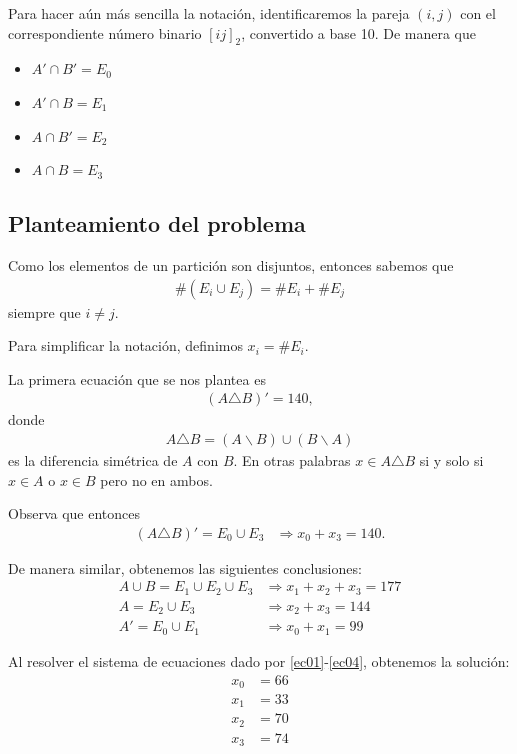 Para hacer aún más sencilla la notación, identificaremos la pareja $ (i,j) $ con el correspondiente número binario $ [ij]_{2} $, convertido a base 10. De manera que 
\begin{itemize}
	\item $ A' \cap B' = E_{0}$
	\item $ A'  \cap B = E_{1}$
	\item $ A \cap B'  = E_{2}$
	\item $ A  \cap B  = E_{3}$
\end{itemize}

\subsection{Planteamiento del problema}

Como los elementos de un partición son disjuntos, entonces sabemos que 
\begin{align}
	\#\left(E_i\cup E_j\right) = \#E_i+\#E_j
\end{align}
siempre que $ i\neq j $.

Para simplificar la notación, definimos $ x_i=\# E_i. $

La primera ecuación que se nos plantea es
\begin{align}
	\left(A \triangle B \right)'=140,
\end{align}
donde 
\begin{align}
	A\triangle B = (A\backslash B)\cup(B\backslash A)
\end{align}
es la diferencia simétrica de $ A $ con $ B $. En otras palabras $ x\in A \triangle B $ si y solo si $ x\in A $ o $ x \in B $ pero no en ambos.

Observa que entonces
\begin{align}
	\label{ec01}
	\left(A\triangle B\right)' = E_0 \cup E_3 &
	\Rightarrow
	x_0 + x_3 = 140.
\end{align}

De manera similar, obtenemos las siguientes conclusiones:
\begin{align}
	\label{ec02}
	A\cup B = E_1\cup E_2 \cup E_3 &
	\Rightarrow x_1+x_2+x_3=177 \\
	\label{ec03}
	A = E_2 \cup E_3 &
	\Rightarrow x_2+x_3 = 144 \\
	\label{ec04}
	A' = E_0 \cup E_1 &
	\Rightarrow x_0+x_1 =99
\end{align}

Al resolver el sistema de ecuaciones dado por  \ref{ec01}-\ref{ec04}, obtenemos la solución:
\begin{align}
	x_0 &= 66 \\
	x_1 &= 33 \\
	x_2 &= 70 \\
	x_3 &= 74
\end{align}

